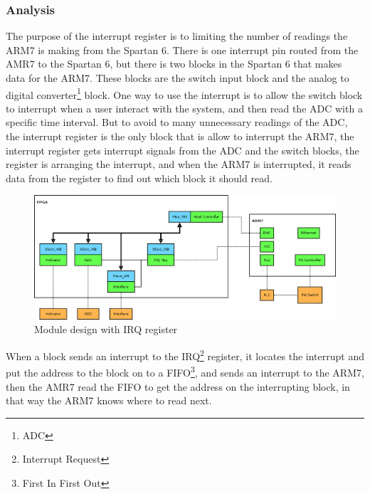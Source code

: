 \subsubsection{Analysis}
The purpose of the interrupt register is to limiting the number of readings the ARM7 is making from the Spartan 6. There is one interrupt pin routed from the AMR7 to the Spartan 6, but there is two blocks in the Spartan 6 that makes data for the ARM7. These blocks are the switch input block and the analog to digital converter\footnote{ADC} block. One way to use the interrupt is to allow the switch block to interrupt when a user interact with the system, and then read the ADC with a specific time interval. But to avoid to many unnecessary readings of the ADC, the interrupt register is the only block that is allow to interrupt the ARM7, the interrupt register gets interrupt signals from the ADC and the switch blocks, the register is arranging the interrupt, and when the ARM7 is interrupted, it reads data from the register to find out which block it should read.
\begin{figure}[H]
	\begin{centering}
		\includegraphics[width=1.0\textwidth]{images/tb5_modules_design.png}
		\caption{Module design with IRQ register}
	\end{centering}
\end{figure}
When a block sends an interrupt to the IRQ\footnote{Interrupt Request} register, it locates the interrupt and put the address to the block on to a FIFO\footnote{First In First Out}, and sends an interrupt to the ARM7, then the AMR7 read the FIFO to get the address on the interrupting block, in that way the ARM7 knows where to read next.
%
%
